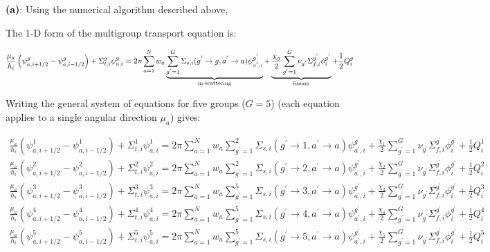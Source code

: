 \documentclass[10pt]{article}
\newcommand*\circled[1]{\tikz[baseline=(char.base)]{
            \node[shape=circle,draw,inner sep=2pt] (char) {#1};}}
\begin{document}
\textbf{(a)}: Using the numerical algorithm described above, 









\circled{4} The 1-D form of the multigroup transport equation is:

\begin{equation}
\frac{\mu_a}{h_i}\left(\psi_{a,i+1/2}^g-\psi_{a,i-1/2}^g\right)+\Sigma_{t,i}^g\psi_{a,i}^g=2\pi\sum_{a=1}^{N}w_a\underbrace{\sum_{g^{'}=1}^G\Sigma_{s,i}(g^{'}\rightarrow g, a^{'}\rightarrow a)\psi_{a^{'},i}^{g^{'}}}_\text{in-scattering}+\underbrace{\frac{\chi_g}{2}\sum_{g^{'}=1}^{G}\nu_{g^{'}}\Sigma_{f,i}^{g^{'}}\phi_{i}^{g^{'}}}_\text{fission}+\frac{1}{2}Q_i^g\\
\end{equation}

Writing the general system of equations for five groups (\(G=5\)) (each equation applies to a single angular direction \(\mu_a\)) gives:

\begin{equation}
\begin{aligned}
\frac{\mu_a}{h_i}\left(\psi_{a,i+1/2}^1-\psi_{a,i-1/2}^1\right)+\Sigma_{t,i}^1\psi_{a,i}^1=2\pi\sum_{a=1}^{N}w_a\sum_{g^{'}=1}^2\Sigma_{s,i}(g^{'}\rightarrow 1, a^{'}\rightarrow a)\psi_{a^{'},i}^{g^{'}}+\frac{\chi_1}{2}\sum_{g^{'}=1}^{G}\nu_{g^{'}}\Sigma_{f,i}^{g^{'}}\phi_{i}^{g^{'}}+\frac{1}{2}Q_i^1\\
\frac{\mu_a}{h_i}\left(\psi_{a,i+1/2}^2-\psi_{a,i-1/2}^2\right)+\Sigma_{t,i}^2\psi_{a,i}^2=2\pi\sum_{a=1}^{N}w_a\sum_{g^{'}=1}^2\Sigma_{s,i}(g^{'}\rightarrow 2, a^{'}\rightarrow a)\psi_{a^{'},i}^{g^{'}}+\frac{\chi_2}{2}\sum_{g^{'}=1}^{G}\nu_{g^{'}}\Sigma_{f,i}^{g^{'}}\phi_{i}^{g^{'}}+\frac{1}{2}Q_i^2\\
\frac{\mu_a}{h_i}\left(\psi_{a,i+1/2}^3-\psi_{a,i-1/2}^3\right)+\Sigma_{t,i}^3\psi_{a,i}^3=2\pi\sum_{a=1}^{N}w_a\sum_{g^{'}=1}^5\Sigma_{s,i}(g^{'}\rightarrow 3, a^{'}\rightarrow a)\psi_{a^{'},i}^{g^{'}}+\frac{\chi_3}{2}\sum_{g^{'}=1}^{G}\nu_{g^{'}}\Sigma_{f,i}^{g^{'}}\phi_{i}^{g^{'}}+\frac{1}{2}Q_i^3\\
\frac{\mu_a}{h_i}\left(\psi_{a,i+1/2}^4-\psi_{a,i-1/2}^4\right)+\Sigma_{t,i}^4\psi_{a,i}^4=2\pi\sum_{a=1}^{N}w_a\sum_{g^{'}=1}^5\Sigma_{s,i}(g^{'}\rightarrow 4, a^{'}\rightarrow a)\psi_{a^{'},i}^{g^{'}}+\frac{\chi_4}{2}\sum_{g^{'}=1}^{G}\nu_{g^{'}}\Sigma_{f,i}^{g^{'}}\phi_{i}^{g^{'}}+\frac{1}{2}Q_i^4\\
\frac{\mu_a}{h_i}\left(\psi_{a,i+1/2}^5-\psi_{a,i-1/2}^5\right)+\Sigma_{t,i}^5\psi_{a,i}^5=2\pi\sum_{a=1}^{N}w_a\sum_{g^{'}=1}^5\Sigma_{s,i}(g^{'}\rightarrow 5, a^{'}\rightarrow a)\psi_{a^{'},i}^{g^{'}}+\frac{\chi_5}{2}\sum_{g^{'}=1}^{G}\nu_{g^{'}}\Sigma_{f,i}^{g^{'}}\phi_{i}^{g^{'}}+\frac{1}{2}Q_i^5\\
\end{aligned}
\end{equation}
\end{document}
